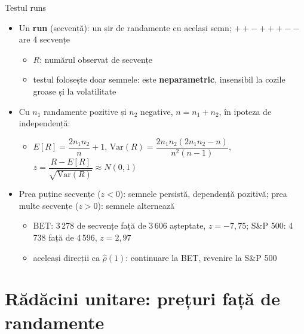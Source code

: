 \begin{frame}{Testul runs}
\itemsize{\small}
\begin{itemize}
    \item Un \textbf{run} (secvență): un șir de randamente cu același semn; $+ + - + + + - -$ are 4 secvențe 
    \begin{itemize}
        \item $R$: numărul observat de secvențe
        \item testul folosește doar semnele: este \textbf{neparametric}, insensibil la cozile groase și la volatilitate
    \end{itemize}
    \item Cu $n_1$ randamente pozitive și $n_2$ negative, $n = n_1 + n_2$, în ipoteza de independență:
    \begin{itemize}
        \item $E[R] = \dfrac{2n_1n_2}{n} + 1$, \quad $\mathrm{Var}(R) = \dfrac{2n_1n_2(2n_1n_2 - n)}{n^2(n-1)}$, \quad $z = \dfrac{R - E[R]}{\sqrt{\mathrm{Var}(R)}} \approx N(0, 1)$
    \end{itemize}
    \item Prea puține secvențe ($z < 0$): semnele persistă, dependență pozitivă; prea multe secvențe ($z > 0$): semnele alternează
    \begin{itemize}
        \item BET: 3\,278 de secvențe față de 3\,606 așteptate, $z = -7{,}75$; S\&P 500: 4\,738 față de 4\,596, $z = 2{,}97$
        \item aceleași direcții ca $\hat\rho(1)$: continuare la BET, revenire la S\&P 500
    \end{itemize}
\end{itemize}
\end{frame}


\section{Rădăcini unitare: prețuri față de randamente}

